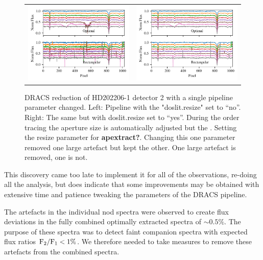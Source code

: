 \begin{figure}
    \centering
    \begin{tabular}{cc}
    \includegraphics[width=0.5\linewidth]{figures/reduction/bp_plots/non_resized_nods_HD202206-1_chip_2} & \includegraphics[width=0.5\linewidth]{figures/reduction/bp_plots/resized_nods_HD202206-1_chip_2}\\
    \end{tabular}
    \caption{DRACS reduction of HD202206-1 detector 2 with a single pipeline parameter changed. Left: Pipeline with the "doslit.resize" set to ``no''. Right: The same but with doslit.resize set to ``yes''. During the order tracing the aperture size is automatically adjusted but the . Setting the resize parameter for \textbf{apextract?}. Changing this one parameter removed one large artefact but kept the other. One large artefact is removed, one is not.}
    \label{fig:resizednods}
\end{figure}

This discovery came too late to implement it for all of the observations, re-doing all the analysis, but does indicate that some improvements may be obtained with extensive time and patience tweaking the parameters of the DRACS pipeline.


The artefacts in the individual nod spectra were observed to create flux deviations in the fully combined optimally extracted spectra of \(\sim 0.5\% \). The purpose of these spectra was to detect faint companion spectra with expected flux ratios \(\rm {F_2}/{F_1} < 1\% \). We therefore needed to take measures to remove these artefacts from the combined spectra.

